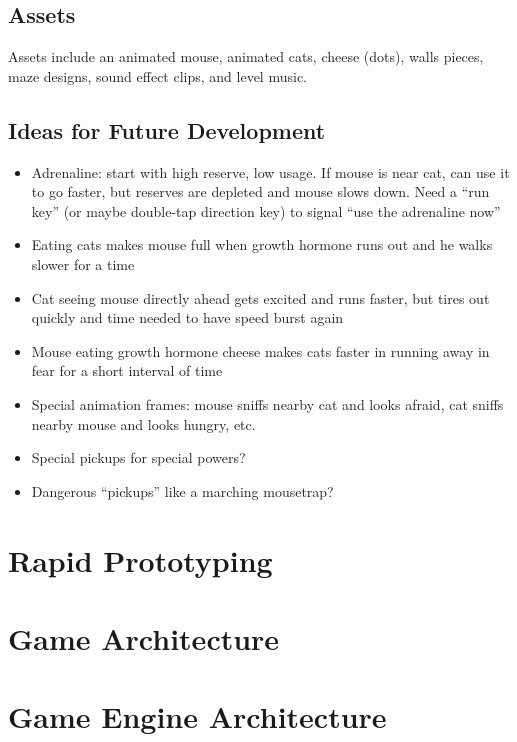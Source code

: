 \documentclass[12pt]{amsbook}
\theoremstyle{definition}
\theoremstyle{remark}
\numberwithin{figure}{chapter}
\numberwithin{table}{chapter}
\numberwithin{section}{chapter}
\numberwithin{equation}{section}
\begin{document}
\subsection{Assets}
Assets include an animated mouse, animated cats, cheese (dots), walls pieces, maze designs, sound effect clips, and level music. 

\subsection{Ideas for Future Development}
\begin{itemize}
\item Adrenaline: start with high reserve, low usage.  If mouse is near cat, can use it to go faster, but reserves are depleted and mouse slows down.  Need a ``run key'' (or maybe double-tap direction key) to signal ``use the adrenaline now''

\item Eating cats makes mouse full when growth hormone runs out and he walks slower for a time

\item Cat seeing mouse directly ahead gets excited and runs faster, but tires out quickly and time needed to have speed burst again

\item Mouse eating growth hormone cheese makes cats faster in running away in fear for a short interval of time

\item Special animation frames: mouse sniffs nearby cat and looks afraid, cat sniffs nearby mouse and looks hungry, etc.

\item Special pickups for special powers?

\item Dangerous ``pickups'' like a marching mousetrap?

\end{itemize} 

\section{Rapid Prototyping}

\section{Game Architecture}

\section{Game Engine Architecture}
\cite{Gre14}
\end{document}
